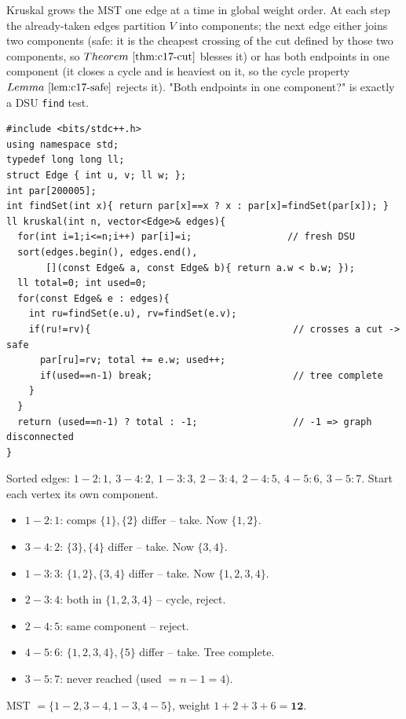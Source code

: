 Kruskal grows the MST one edge at a time in global weight order.  At each step
the already-taken edges partition \(V\) into components; the next edge either
joins two components (safe: it is the cheapest crossing of the cut defined by
those two components, so \(\thmref{c17-cut}\) blesses it) or has both endpoints
in one component (it closes a cycle and is heaviest on it, so the cycle property
\(\lemref{c17-safe}\) rejects it).  "Both endpoints in one component?" is exactly
a DSU \texttt{find} test.

\begin{lstlisting}[caption={Kruskal MST. Sort edges by weight, then union the endpoints, accumulating an edge exactly when its two endpoints were in different components. Uses the Ch.17 DSU. Returns the MST weight and fills the parent structure; total cost is dominated by the sort}, label={lst:c17-kruskal}]
#include <bits/stdc++.h>
using namespace std;
typedef long long ll;
struct Edge { int u, v; ll w; };
int par[200005];
int findSet(int x){ return par[x]==x ? x : par[x]=findSet(par[x]); }
ll kruskal(int n, vector<Edge>& edges){
  for(int i=1;i<=n;i++) par[i]=i;                 // fresh DSU
  sort(edges.begin(), edges.end(),
       [](const Edge& a, const Edge& b){ return a.w < b.w; });
  ll total=0; int used=0;
  for(const Edge& e : edges){
    int ru=findSet(e.u), rv=findSet(e.v);
    if(ru!=rv){                                    // crosses a cut -> safe
      par[ru]=rv; total += e.w; used++;
      if(used==n-1) break;                         // tree complete
    }
  }
  return (used==n-1) ? total : -1;                 // -1 => graph disconnected
}
\end{lstlisting}

\begin{tracebox}
Sorted edges: \(1\!-\!2{:}1,\ 3\!-\!4{:}2,\ 1\!-\!3{:}3,\ 2\!-\!3{:}4,\
2\!-\!4{:}5,\ 4\!-\!5{:}6,\ 3\!-\!5{:}7\).  Start each vertex its own component.
\begin{itemize}[nosep,leftmargin=1.4em]
  \item \(1\!-\!2{:}1\): comps \(\{1\},\{2\}\) differ -- take. Now \(\{1,2\}\).
  \item \(3\!-\!4{:}2\): \(\{3\},\{4\}\) differ -- take. Now \(\{3,4\}\).
  \item \(1\!-\!3{:}3\): \(\{1,2\},\{3,4\}\) differ -- take. Now \(\{1,2,3,4\}\).
  \item \(2\!-\!3{:}4\): both in \(\{1,2,3,4\}\) -- cycle, reject.
  \item \(2\!-\!4{:}5\): same component -- reject.
  \item \(4\!-\!5{:}6\): \(\{1,2,3,4\},\{5\}\) differ -- take. Tree complete.
  \item \(3\!-\!5{:}7\): never reached (used \(=n-1=4\)).
\end{itemize}
MST \(=\{1\!-\!2,3\!-\!4,1\!-\!3,4\!-\!5\}\), weight \(1+2+3+6=\mathbf{12}\).
\end{tracebox}

